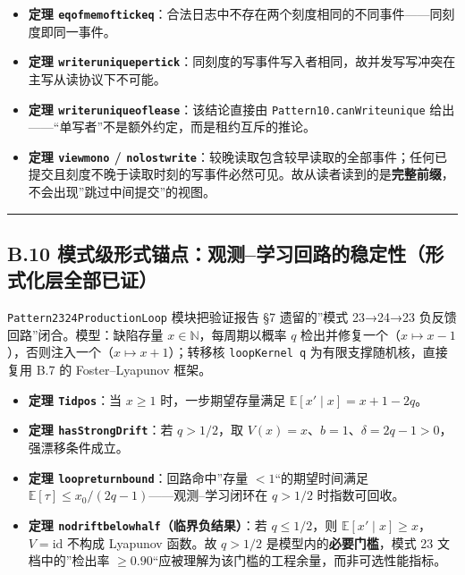 \documentclass[
]{ctexart}
\providecommand{\tightlist}{%
  \setlength{\itemsep}{0pt}\setlength{\parskip}{0pt}}
\renewcommand{\_}{\discretionary{}{}{\textunderscore}}
\begin{document}
\begin{itemize}
\tightlist
\item
  \textbf{定理
  \texttt{eq\_of\_mem\_of\_tick\_eq}}：合法日志中不存在两个刻度相同的不同事件------同刻度即同一事件。
\item
  \textbf{定理
  \texttt{writer\_unique\_per\_tick}}：同刻度的写事件写入者相同，故并发写写冲突在主写从读协议下不可能。
\item
  \textbf{定理 \texttt{writer\_unique\_of\_lease}}：该结论直接由
  \texttt{Pattern10.canWrite\_unique}
  给出------``单写者''不是额外约定，而是租约互斥的推论。
\item
  \textbf{定理 \texttt{view\_mono} /
  \texttt{no\_lost\_write}}：较晚读取包含较早读取的全部事件；任何已提交且刻度不晚于读取时刻的写事件必然可见。故从读者读到的是\textbf{完整前缀}，不会出现''跳过中间提交''的视图。
\end{itemize}

\begin{center}\rule{0.5\linewidth}{0.5pt}\end{center}

\subsection{B.10
模式级形式锚点：观测--学习回路的稳定性（形式化层全部已证）}\label{b.10-ux6a21ux5f0fux7ea7ux5f62ux5f0fux951aux70b9ux89c2ux6d4bux5b66ux4e60ux56deux8defux7684ux7a33ux5b9aux6027ux5f62ux5f0fux5316ux5c42ux5168ux90e8ux5df2ux8bc1}

\texttt{Pattern23\_24\_ProductionLoop} 模块把验证报告 §7 遗留的''模式
23→24→23 负反馈回路''闭合。模型：缺陷存量
\(x\in\mathbb N\)，每周期以概率 \(q\)
检出并修复一个（\(x\mapsto x-1\)），否则注入一个（\(x\mapsto x+1\)）；转移核
\texttt{loopKernel\ q} 为有限支撑随机核，直接复用 B.7 的
Foster--Lyapunov 框架。

\begin{itemize}
\tightlist
\item
  \textbf{定理 \texttt{T\_id\_pos}}：当 \(x\ge 1\) 时，一步期望存量满足
  \(\mathbb E[x'\mid x]=x+1-2q\)。
\item
  \textbf{定理 \texttt{hasStrongDrift}}：若 \(q>1/2\)，取
  \(V(x)=x\)、\(b=1\)、\(\delta=2q-1>0\)，强漂移条件成立。
\item
  \textbf{定理 \texttt{loop\_return\_bound}}：回路命中''存量
  \(<1\)``的期望时间满足
  \(\mathbb E[\tau]\le x_0/(2q-1)\)------观测--学习闭环在 \(q>1/2\)
  时指数可回收。
\item
  \textbf{定理 \texttt{no\_drift\_below\_half}（临界负结果）}：若
  \(q\le 1/2\)，则 \(\mathbb E[x'\mid x]\ge x\)，\(V=\mathrm{id}\)
  不构成 Lyapunov 函数。故 \(q>1/2\) 是模型内的\textbf{必要门槛}，模式
  23 文档中的''检出率
  \(\ge0.90\)``应被理解为该门槛的工程余量，而非可选性能指标。
\end{itemize}
\end{document}
